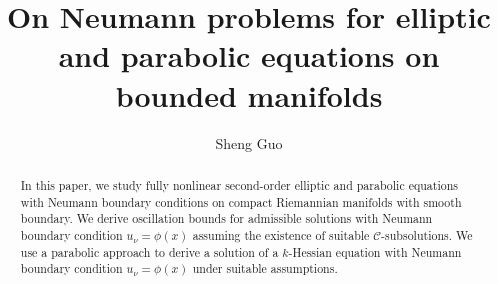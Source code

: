 \documentclass[12pt]{amsart}
\theoremstyle{definition}
\theoremstyle{remark}
\numberwithin{equation}{section}
\begin{document}
	\setlength{\baselineskip}{1.2\baselineskip}
		
	\title[On Neumann problems for elliptic and parabolic equations]{On Neumann problems for elliptic and parabolic equations on bounded manifolds}
	
	\author{Sheng Guo}
	
	\address{Department of Mathematics, Ohio State University, Columbus, OH 43210}
	
	\maketitle
	
\begin{abstract}
	In this paper, we study fully nonlinear second-order elliptic and parabolic equations with Neumann boundary conditions on compact Riemannian manifolds with smooth boundary. 
	We derive oscillation bounds for admissible solutions with Neumann boundary condition $u_\nu = \phi(x)$ assuming the existence of suitable $\mathcal{C}$-subsolutions. 
	We use a parabolic approach to derive a solution of a $k$-Hessian equation with  Neumann boundary condition $u_\nu = \phi(x)$ under suitable assumptions.
\end{abstract}

	
\end{document}
